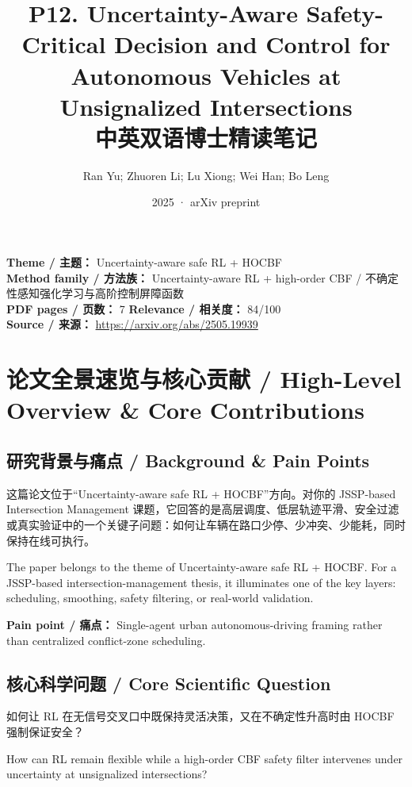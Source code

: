 \documentclass[UTF8,a4paper,11pt,fontset=fandol]{ctexart}
\title{P12. Uncertainty-Aware Safety-Critical Decision and Control for Autonomous Vehicles at Unsignalized Intersections\\中英双语博士精读笔记}
\author{Ran Yu; Zhuoren Li; Lu Xiong; Wei Han; Bo Leng}
\date{2025 · arXiv preprint}
\begin{document}
\maketitle

\noindent\textbf{Theme / 主题：} Uncertainty-aware safe RL + HOCBF\\
\textbf{Method family / 方法族：} Uncertainty-aware RL + high-order CBF / 不确定性感知强化学习与高阶控制屏障函数\\
\textbf{PDF pages / 页数：} 7 \quad
\textbf{Relevance / 相关度：} 84/100\\
\textbf{Source / 来源：} \url{https://arxiv.org/abs/2505.19939}

\section{论文全景速览与核心贡献 / High-Level Overview \& Core Contributions}
\subsection{研究背景与痛点 / Background \& Pain Points}
这篇论文位于“Uncertainty-aware safe RL + HOCBF”方向。对你的 JSSP-based Intersection Management 课题，它回答的是高层调度、低层轨迹平滑、安全过滤或真实验证中的一个关键子问题：如何让车辆在路口少停、少冲突、少能耗，同时保持在线可执行。

The paper belongs to the theme of Uncertainty-aware safe RL + HOCBF. For a JSSP-based intersection-management thesis, it illuminates one of the key layers: scheduling, smoothing, safety filtering, or real-world validation.

\textbf{Pain point / 痛点：} Single-agent urban autonomous-driving framing rather than centralized conflict-zone scheduling.

\subsection{核心科学问题 / Core Scientific Question}
如何让 RL 在无信号交叉口中既保持灵活决策，又在不确定性升高时由 HOCBF 强制保证安全？

How can RL remain flexible while a high-order CBF safety filter intervenes under uncertainty at unsignalized intersections?
\end{document}
